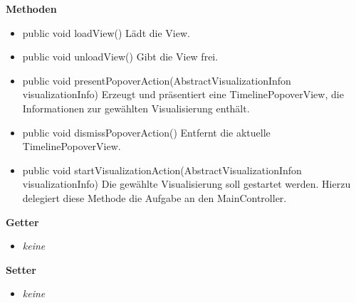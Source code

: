 \documentclass{article}
\begin{document}
      \textbf{Methoden}
      \begin{itemize}
        \item public void loadView() \newline
        Lädt die View.
        \item public void unloadView() \newline
        Gibt die View frei.
        \item public void presentPopoverAction(AbstractVisualizationInfon visualizationInfo) \newline
        Erzeugt und präsentiert eine TimelinePopoverView, die Informationen zur gewählten Visualisierung enthält.
        \item public void dismissPopoverAction() \newline
        Entfernt die aktuelle TimelinePopoverView.
        \item public void startVisualizationAction(AbstractVisualizationInfon visualizationInfo) \newline
        Die gewählte Visualisierung soll gestartet werden. Hierzu delegiert diese Methode die Aufgabe an den MainController.
      \end{itemize}

      \textbf{Getter}
      \begin{itemize}
        \item \textit{keine}
      \end{itemize}

      \textbf{Setter}
      \begin{itemize}
        \item \textit{keine}
      \end{itemize}
\end{document}
